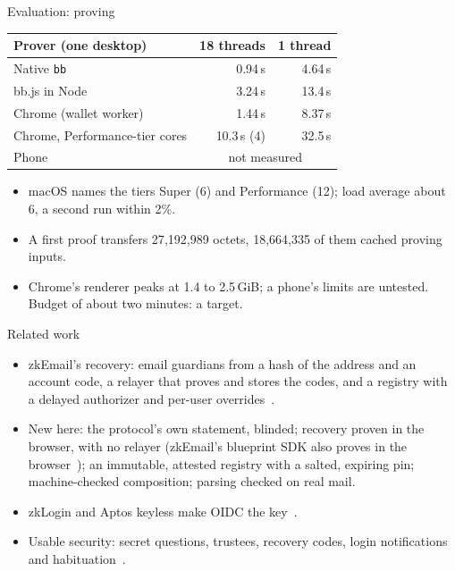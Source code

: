 \documentclass[aspectratio=169,11pt]{beamer}
\begin{document}
\begin{frame}{Evaluation: proving}
  \small
  \begin{tabular}{@{}lrr@{}}
    \toprule
    Prover (one desktop) & 18 threads & 1 thread \\
    \midrule
    Native \texttt{bb} & 0.94\,s & 4.64\,s \\
    bb.js in Node & 3.24\,s & 13.4\,s \\
    Chrome (wallet worker) & 1.44\,s & 8.37\,s \\
    Chrome, Performance-tier cores & 10.3\,s (4) & 32.5\,s \\
    Phone & \multicolumn{2}{c}{not measured} \\
    \bottomrule
  \end{tabular}
  \par{}
  \par\medskip
  \begin{itemize}\footnotesize
    \item macOS names the tiers Super (6) and Performance (12); load average
      about 6, a second run within 2\%.
    \item A first proof transfers 27{,}192{,}989 octets, 18{,}664{,}335 of
      them cached proving inputs.
    \item Chrome's renderer peaks at 1.4 to 2.5\,GiB; a phone's limits are
      untested. Budget of about two minutes: a target.
  \end{itemize}
\end{frame}

\begin{frame}{Related work}
  \small
  \begin{itemize}
    \item zkEmail's recovery: email guardians from a hash of the address and
      an account code, a relayer that proves and stores the codes, and a
      registry with a delayed authorizer and per-user
      overrides~\cite{zkemail-recovery,zkemail-tx-builder,zkemail-user-overrideable-registry}.
    \item New here: the protocol's own statement, blinded; recovery proven
      in the browser, with no relayer (zkEmail's blueprint SDK also proves
      in the browser~\cite{zkemail-sdk-js}); an immutable, attested registry
      with a salted, expiring pin; machine-checked composition; parsing
      checked on real mail.
    \item zkLogin and Aptos keyless make OIDC the key~\cite{zklogin,aptos-aip61}.
    \item Usable security: secret questions, trustees, recovery codes,
      login notifications and
      habituation~\cite{schechter-secret-questions,schechter-social-recovery,holtervennhoff-recovery-codes,markert-login-notifications,anderson-habituation}.
  \end{itemize}
\end{frame}
\end{document}
